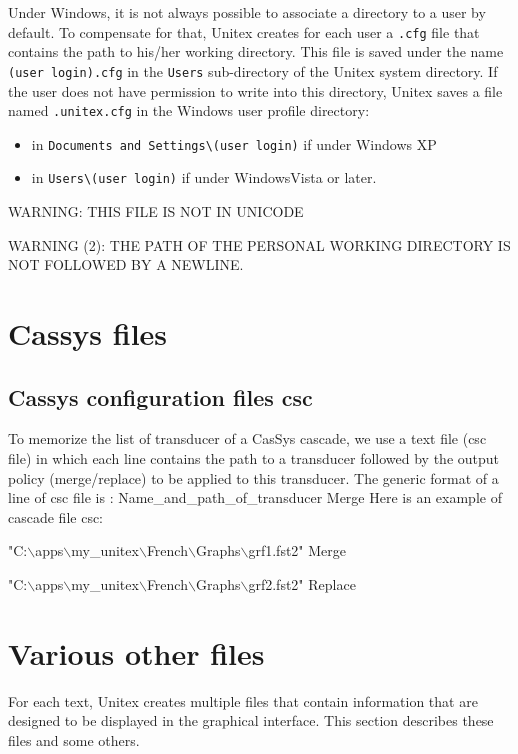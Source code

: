 \bigskip
\noindent Under Windows, it is not always possible to associate a directory to a user by
default. To compensate for that, Unitex creates for each user a \verb+.cfg+ file
that contains the path to his/her working directory.
This file is saved under the name \verb+(user login).cfg+ in the \verb+Users+ sub-directory
of the Unitex system directory.
If the user does not have permission to write into this directory, Unitex saves a file named \verb+.unitex.cfg+
 in the Windows user profile directory:
\begin{itemize}
\item in \verb+Documents and Settings\(user login)+ if under Windows XP
\item in \verb+Users\(user login)+ if under WindowsVista or later.
\end{itemize}

\bigskip
\noindent WARNING:  THIS FILE IS NOT IN UNICODE

\bigskip
\noindent WARNING (2): THE PATH OF THE PERSONAL WORKING
DIRECTORY IS NOT FOLLOWED BY A NEWLINE.

\section{Cassys files}

\subsection{Cassys configuration files csc}

To memorize the list of transducer of a CasSys cascade, we use a text file (csc file) in which each line contains the path to a transducer followed by the output policy (merge/replace) to be applied to this transducer.
The generic format of a line of csc file is : Name\_and\_path\_of\_transducer  Merge
Here is an example of cascade file csc:

\ttfamily
"C:$\backslash$apps$\backslash$my\_unitex$\backslash$French$\backslash$Graphs$\backslash$grf1.fst2" Merge

"C:$\backslash$apps$\backslash$my\_unitex$\backslash$French$\backslash$Graphs$\backslash$grf2.fst2" Replace
\rmfamily

\section{Various other files}
For each text, Unitex creates multiple files that contain information that are
designed to be displayed in the graphical interface. This section describes these
files and some others.


